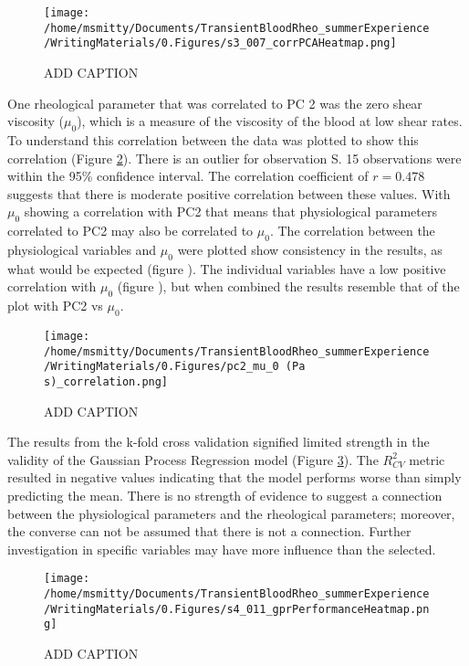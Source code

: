 \documentclass[12pt,letterpaper]{article}
\begin{document}
\begin{figure}[ht]
    \centering
    \texttt{[image: /home/msmitty/Documents/TransientBloodRheo\_summerExperience/WritingMaterials/0.Figures/s3\_007\_corrPCAHeatmap.png]}
    \caption{ADD CAPTION}
    \label{fig:s3007}
\end{figure}

One rheological parameter that was correlated to PC 2 was the zero shear viscosity ($\mu_0$), which is a measure of the viscosity of the blood at low shear rates. To understand this correlation between the data was plotted to show
this correlation (Figure \ref{fig:pc2-mu}). There is an outlier for observation S. 15 observations were within the 95\% confidence interval. The correlation coefficient of $r=0.478$ suggests that there is moderate positive correlation between these values.
With $\mu_0$ showing a correlation with PC2 that means that physiological parameters correlated to PC2 may also be correlated to $\mu_0$. The correlation between the physiological variables and $\mu_0$ were plotted show
consistency in the results, as what would be expected (figure ). The individual variables have a low positive correlation with $\mu_0$ (figure ), but when combined the results resemble that of the plot with PC2 vs $\mu_0$.

\begin{figure}[ht]
    \centering
    \texttt{[image: /home/msmitty/Documents/TransientBloodRheo\_summerExperience/WritingMaterials/0.Figures/pc2\_mu\_0 (Pa s)\_correlation.png]}
    \caption{ADD CAPTION}
    \label{fig:pc2-mu}
\end{figure}

The results from the k-fold cross validation signified limited strength in the validity of the Gaussian Process Regression model (Figure \ref{fig:s4011}). The $R^2_{CV}$ metric resulted in negative values indicating that the model performs worse
than simply predicting the mean. There is no strength of evidence to suggest a connection between the physiological parameters and the rheological parameters; moreover, the converse can not be assumed that there is not a connection.
Further investigation in specific variables may have more influence than the selected.

\begin{figure}[ht]
    \centering
    \texttt{[image: /home/msmitty/Documents/TransientBloodRheo\_summerExperience/WritingMaterials/0.Figures/s4\_011\_gprPerformanceHeatmap.png]}
    \caption{ADD CAPTION}
    \label{fig:s4011}
\end{figure}
\end{document}
